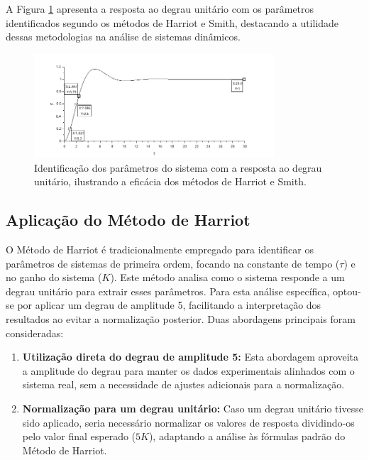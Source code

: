 A Figura \ref{fig:sistema-identificado-forcado-normalizado} apresenta a resposta ao degrau unitário com os parâmetros identificados segundo os métodos de Harriot e Smith, destacando a utilidade dessas metodologias na análise de sistemas dinâmicos.

\begin{figure}[h]
    \centering
    \includegraphics[width=0.8\textwidth]{atividades/10-atividade/assets/sistema-identificado-forcado-normalizado.png}
    \caption{Identificação dos parâmetros do sistema com a resposta ao degrau unitário, ilustrando a eficácia dos métodos de Harriot e Smith.}
    \label{fig:sistema-identificado-forcado-normalizado}
\end{figure}

\subsection{Aplicação do Método de Harriot}

O Método de Harriot é tradicionalmente empregado para identificar os parâmetros de sistemas de primeira ordem, focando na constante de tempo (\(\tau\)) e no ganho do sistema (\(K\)). Este método analisa como o sistema responde a um degrau unitário para extrair esses parâmetros. Para esta análise específica, optou-se por aplicar um degrau de amplitude 5, facilitando a interpretação dos resultados ao evitar a normalização posterior. Duas abordagens principais foram consideradas:

\begin{enumerate}
    \item \textbf{Utilização direta do degrau de amplitude 5:} Esta abordagem aproveita a amplitude do degrau para manter os dados experimentais alinhados com o sistema real, sem a necessidade de ajustes adicionais para a normalização.
    \item \textbf{Normalização para um degrau unitário:} Caso um degrau unitário tivesse sido aplicado, seria necessário normalizar os valores de resposta dividindo-os pelo valor final esperado (\(5K\)), adaptando a análise às fórmulas padrão do Método de Harriot.
\end{enumerate}

